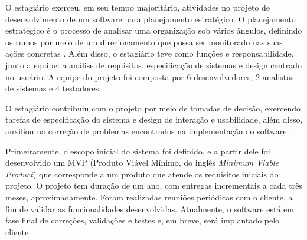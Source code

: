 O estagiário exerceu, em seu tempo majoritário, atividades no projeto de desenvolvimento de um software para planejamento estratégico. O planejamento estratégico é o processo de analisar uma organização sob vários ângulos, definindo os rumos por meio de um direcionamento que possa ser monitorado nas suas ações concretas \cite{planejamentoEstrategico}. Além disso, o estagiário teve como funções e responsabilidade, junto a equipe: a análise de requisitos, especificação de sistemas e design centrado no usuário. A equipe do projeto foi composta por 6 desenvolvedores, 2 analistas de sistemas e 4 testadores.


O estagiário contribuiu com o projeto por meio de tomadas de decisão, exercendo tarefas de especificação do sistema e design de interação e usabilidade, além disso, auxiliou na correção de problemas encontrados na implementação do software.


Primeiramente, o escopo inicial do sistema foi definido, e a partir dele foi desenvolvido um MVP (Produto Viável Mínimo, do inglês \textit{Minimum Viable Product}) que corresponde a um produto que atende os requisitos iniciais do projeto. O projeto tem duração de um ano, com entregas incrementais a cada três meses, aproximadamente. Foram realizadas reuniões periódicas com o cliente, a fim de validar as funcionalidades desenvolvidas. Atualmente, o software está em fase final de correções, validações e testes e, em breve, será implantado pelo cliente.





